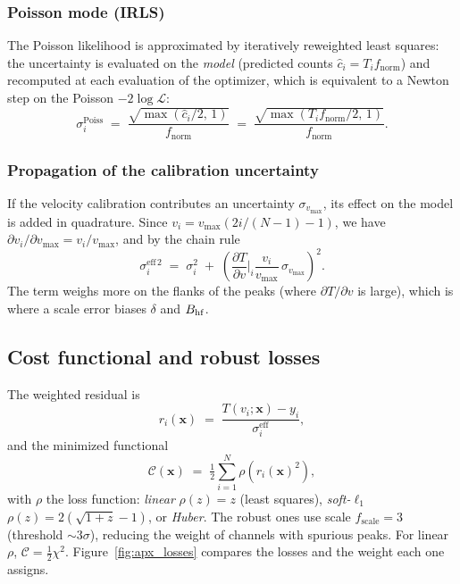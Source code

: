 \subsubsection{Poisson mode (IRLS)}
The Poisson likelihood is approximated by iteratively reweighted least squares: the
uncertainty is evaluated on the \emph{model} (predicted counts
$\hat c_i = T_i f_{\text{norm}}$) and recomputed at each evaluation of the
optimizer, which is equivalent to a Newton step on the Poisson $-2\log\mathcal L$:
\begin{equation}
  \sigma_i^{\text{Poiss}} \;=\; \frac{\sqrt{\max(\hat c_i/2,\,1)}}{f_{\text{norm}}}
  \;=\; \frac{\sqrt{\max(T_i f_{\text{norm}}/2,\,1)}}{f_{\text{norm}}}.
  \label{eq:sigma-poisson}
\end{equation}

\subsubsection{Propagation of the calibration uncertainty}\label{sec:calib}
If the velocity calibration contributes an uncertainty $\sigma_{v_{\max}}$, its
effect on the model is added in quadrature. Since $v_i=v_{\max}(2i/(N-1)-1)$, we
have $\partial v_i/\partial v_{\max}=v_i/v_{\max}$, and by the chain rule
\begin{equation}
  \sigma_i^{\text{eff}\,2} \;=\; \sigma_i^2 \;+\;
  \left(\frac{\partial T}{\partial v}\bigg|_i \frac{v_i}{v_{\max}}\,\sigma_{v_{\max}}\right)^{\!2}.
  \label{eq:calib}
\end{equation}
The term weighs more on the flanks of the peaks (where $\partial T/\partial v$ is
large), which is where a scale error biases $\delta$ and $B_{\mathrm{hf}}$.

\subsection{Cost functional and robust losses}\label{sec:cost}

The weighted residual is
\begin{equation}
  r_i(\bm x) \;=\; \frac{T(v_i;\bm x)-y_i}{\sigma_i^{\text{eff}}},
  \label{eq:residuo}
\end{equation}
and the minimized functional
\begin{equation}
  \mathcal C(\bm x) \;=\; \tfrac12 \sum_{i=1}^{N}\rho\!\left(r_i(\bm x)^2\right),
  \label{eq:cost}
\end{equation}
with $\rho$ the loss function: \emph{linear} $\rho(z)=z$ (least squares),
\emph{soft-}$\ell_1$ $\rho(z)=2(\sqrt{1+z}-1)$, or \emph{Huber}. The robust ones
use scale $f_{\text{scale}}=3$ (threshold $\sim3\sigma$), reducing the weight of
channels with spurious peaks. For linear $\rho$, $\mathcal C=\tfrac12\chi^2$.
Figure~\ref{fig:apx_losses} compares the losses and the weight each one assigns.

